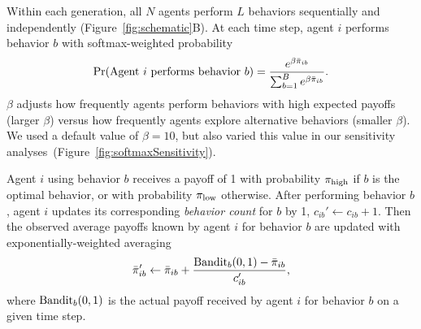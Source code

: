 \documentclass[letterpaper,11.5pt]{scrartcl}
\begin{document}
Within each generation, all $N$ agents perform $L$ behaviors sequentially and
independently (Figure~\ref{fig:schematic}B).
At each time step, agent $i$ performs behavior $b$ with softmax-weighted probability
\begin{equation}
  \Pr(\text{Agent $i$ performs behavior $b$}) = 
    \frac{e^{\beta \bar\pi_{ib}}}{\sum_{b=1}^B e^{\beta \bar\pi_{ib}}}.
\end{equation}
\noindent
$\beta$ adjusts how frequently agents perform 
behaviors with high expected payoffs (larger $\beta$) versus how frequently
agents explore alternative behaviors (smaller $\beta$). %
We used a default value of $\beta = 10$, but also varied this value in our
sensitivity analyses~(Figure~\ref{fig:softmaxSensitivity}). 

Agent $i$ using behavior $b$ receives a payoff of 1 with probability $\pi_{\mathrm{high}}$
if $b$ is the optimal behavior, or with probability $\pi_{\mathrm{low}}$ otherwise. 
After performing behavior $b$, agent $i$ updates its
corresponding \emph{behavior count} for $b$ by 1, $c_{ib}' \leftarrow c_{ib} + 1$.
Then the observed average payoffs known by agent $i$ for behavior $b$ are updated with
exponentially-weighted averaging
\begin{equation}
  \bar\pi_{ib}' \leftarrow \bar\pi_{ib} + \frac{\text{Bandit}_b(0, 1) - \bar\pi_{ib}}{c_{ib}'},
\end{equation}
\noindent
where $\text{Bandit}_b(0, 1)$ is the actual payoff received by agent $i$ for behavior $b$ on a
given %
time step. 
\end{document}
